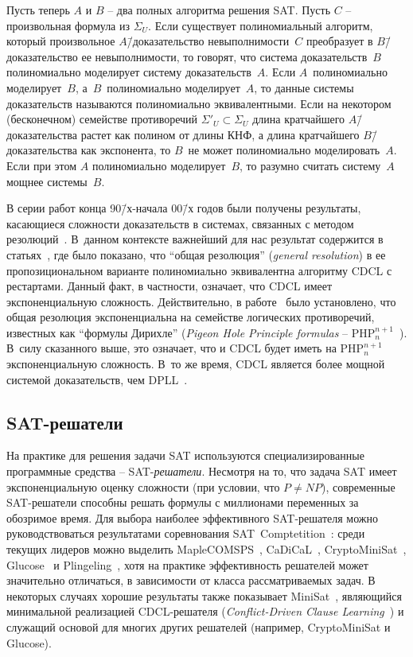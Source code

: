 Пусть теперь $A$ и $B$ \--- два полных алгоритма решения SAT.
Пусть $C$ \--- произвольная формула из $\Sigma_{U}$.
Если существует полиномиальный алгоритм, который произвольное $A$\=/доказательство невыполнимости~$C$ преобразует в $B$\=/доказательство ее невыполнимости, то говорят, что система доказательств~$B$ полиномиально моделирует систему доказательств~$A$.
Если $A$~полиномиально моделирует~$B$, а~$B$~полиномиально моделирует~$A$, то данные системы доказательств называются полиномиально эквивалентными.
Если на некотором (бесконечном) семействе противоречий ${\Sigma'}_{U} \subset \Sigma_{U}$ длина кратчайшего $A $\=/доказательства растет как полином от длины КНФ, а длина кратчайшего $B$\=/доказательства как экспонента, то $B$~не может полиномиально моделировать~$A$.
Если при этом $A$ полиномиально моделирует~$B$, то разумно считать систему~$A$ мощнее системы~$B$.

В серии работ конца 90\=/х\--начала 00\=/х годов были получены результаты, касающиеся сложности доказательств в системах, связанных с методом резолюций~\cite{robinson1965}.
В~данном контексте важнейший для нас результат содержится в статьях~\cite{beame2003,beame2004}, где было показано, что \enquote{общая резолюция} (\textit{general resolution}) в ее пропозициональном варианте полиномиально эквивалентна алгоритму CDCL с рестартами.
Данный факт, в частности, означает, что CDCL имеет экспоненциальную сложность.
Действительно, в работе~\cite{haken1985} было установлено, что общая резолюция экспоненциальна на семействе логических противоречий, известных как \enquote{формулы Дирихле} (\textit{Pigeon Hole Principle formulas} \--- $\mathrm{PHP}_{n}^{n + 1}$~\cite{ben-sasson2004}).
В~силу сказанного выше, это означает, что и CDCL будет иметь на $\mathrm{PHP}_{n}^{n + 1}$ экспоненциальную сложность.
В~то же время, CDCL является более мощной системой доказательств, чем DPLL~\cite{beame2003,beame2004,ben-sasson2004}.


\subsection{SAT-решатели}
\label{sub:sat-solvers}

На практике для решения задачи SAT используются специализированные программные средства \--- SAT-\textit{решатели}.
Несмотря на то, что задача SAT имеет экспоненциальную оценку сложности (при условии, что $P \neq NP$), современные SAT-решатели способны решать формулы с миллионами переменных за обозримое время.
Для выбора наиболее эффективного SAT-решателя можно руководствоваться результатами соревнования SAT~Comptetition~\cite{sat-competition}: среди текущих лидеров можно выделить MapleCOMSPS~\cite{liang-2016}, CaDiCaL~\cite{cadical}, CryptoMiniSat~\cite{cryptominisat}, Glucose~\cite{glucose} и Plingeling~\cite{lingeling-and-friends}, хотя на практике эффективность решателей может значительно отличаться, в зависимости от класса рассматриваемых задач.
В некоторых случаях хорошие результаты также показывает MiniSat~\cite{minisat}, являющийся минимальной реализацией CDCL-решателя (\textit{Conflict-Driven Clause Learning}~\cite{grasp}) и служащий основой для многих других решателей (например, CryptoMiniSat и Glucose).


